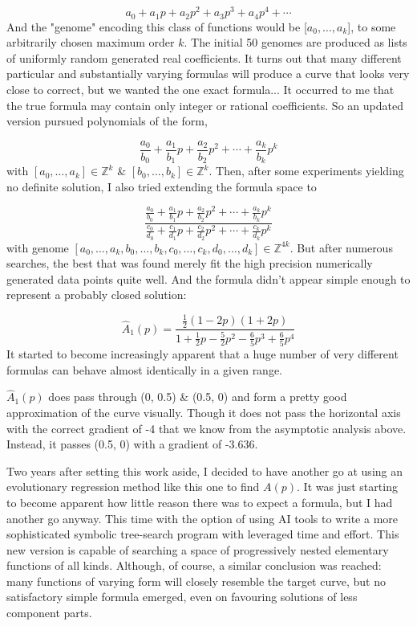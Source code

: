 \documentclass[11pt]{article}
\begin{document}
$$a_0 + a_1p + a_2 p^2 + a_3 p^3 + a_4 p^4 + \cdots$$
And the "genome" encoding this class of functions would be [$a_0,\dots,a_k$], to some arbitrarily chosen maximum order $k$.
The initial 50 genomes are produced as lists of uniformly random generated real coefficients.
It turns out that many different particular and substantially varying formulas will produce a curve that looks very close to correct, but we wanted the one exact formula...
It occurred to me that the true formula may contain only integer or rational coefficients. So an updated version pursued polynomials of the form,


$$\frac{a_0}{b_0} +\frac{a_1}{b_1}p +\frac{a_2}{b_2}p^2 +\cdots+\frac{a_k}{b_k}p^k$$
with $[a_0,\dots,a_k]\in\mathbb{Z}^k$ \& $[b_0,\dots,b_k]\in\mathbb{Z}^k$. Then, after some experiments yielding no definite solution, I also tried extending the formula space to 



$$\frac{\frac{a_0}{b_0} +\frac{a_1}{b_1}p +\frac{a_2}{b_2}p^2 +\cdots+\frac{a_k}{b_k}p^k}{\frac{c_0}{d_0} +\frac{c_1}{d_1}p +\frac{c_2}{d_2}p^2 +\cdots+\frac{c_k}{d_k}p^k}$$
with genome $[a_0,\dots,a_k,b_0,\dots,b_k,c_0,\dots,c_k,d_0,\dots,d_k]\in\mathbb{Z}^{4k}$.
But after numerous searches, the best that was found merely fit the high precision numerically generated data points quite well. And the formula didn't appear simple enough to represent a probably closed solution: 

$$\hat A_1(p) = \frac{\frac{1}{2}(1-2p)(1+2p)}{1 + \frac{1}{2}p - \frac{5}{2}p^2 - \frac{6}{5}p^3 + \frac{6}{5}p^4}$$
It started to become increasingly apparent that a huge number of very different formulas can behave almost identically in a given range. 

$\hat A_1(p)$ does pass through (0, 0.5) \& (0.5, 0) and form a pretty good approximation of the curve visually. Though it does not pass the horizontal axis with the correct gradient of -4 that we know from the asymptotic analysis above. Instead, it passes (0.5, 0) with a gradient of -3.636.

\vspace{10pt}
\noindent
Two years after setting this work aside, I decided to have another go at using an evolutionary regression method like this one to find $A(p)$.
It was just starting to become apparent how little reason there was to expect a formula, but I had another go anyway. This time with the option of using AI tools to write a 
more sophisticated symbolic tree-search program with leveraged time and effort. This new version is capable of searching a space of progressively nested elementary functions of all kinds. Although, of course, a similar
conclusion was reached: many functions of varying form will closely resemble the target curve, but no satisfactory simple formula emerged, even on favouring solutions of less component parts.
\end{document}
